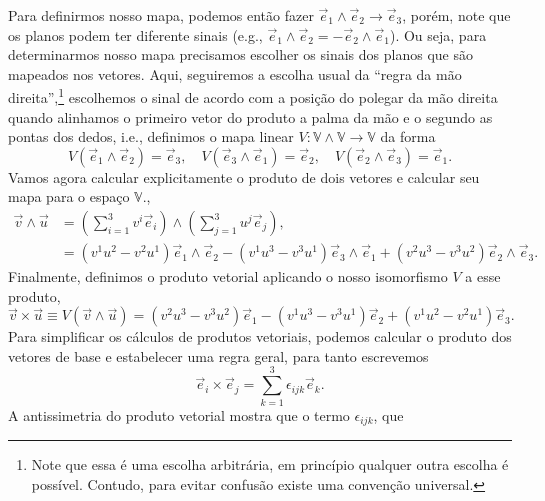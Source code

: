 Para definirmos nosso mapa, podemos então fazer $\vec{e}_1\wedge\vec{e}_2 \to
	\vec{e}_3$, porém, note que os planos podem ter diferente sinais (e.g.,
$\vec{e}_1\wedge\vec{e}_2 = -\vec{e}_2\wedge\vec{e}_1$). Ou seja, para
determinarmos nosso mapa precisamos escolher os sinais dos planos que são
mapeados nos vetores. Aqui, seguiremos a escolha usual da ``regra da mão
direita'',\footnote{Note que essa é uma escolha arbitrária, em princípio
	qualquer outra escolha é possível. Contudo, para evitar confusão existe uma
	convenção universal.} escolhemos o sinal de acordo com a posição do polegar da
mão direita quando alinhamos o primeiro vetor do produto a palma da mão e o
segundo as pontas dos dedos, i.e., definimos o mapa linear
$V:\mathbb{V}\wedge\mathbb{V}\to\mathbb{V}$ da forma
\begin{equation}\label{vecprod}
	V(\vec{e}_1\wedge\vec{e}_2) = \vec{e}_3, \quad V(\vec{e}_3\wedge\vec{e}_1) = \vec{e}_2, \quad V(\vec{e}_2\wedge\vec{e}_3) = \vec{e}_1.
\end{equation}
Vamos agora calcular explicitamente o produto de dois vetores e calcular seu
mapa para o espaço $\mathbb{V}$.,
\begin{equation}\label{wedprod}
	\begin{split}
		\vec{v}\wedge\vec{u} & = \left(\sum_{i=1}^3v^i\vec{e}_i\right)\wedge\left(\sum_{j=1}^3u^j\vec{e}_j\right),                                                                         \\
		                     & = \left(v^1u^2-v^2u^1\right)\vec{e}_1\wedge\vec{e}_2-\left(v^1u^3-v^3u^1\right)\vec{e}_3\wedge\vec{e}_1+\left(v^2u^3-v^3u^2\right)\vec{e}_2\wedge\vec{e}_3.
	\end{split}
\end{equation}
Finalmente, definimos o produto vetorial aplicando o nosso isomorfismo $V$ a
esse produto,
\begin{equation}\label{vprod}
	\vec{v}\times\vec{u} \equiv V(\vec{v}\wedge\vec{u}) =\left(v^2u^3-v^3u^2\right)\vec{e}_1-\left(v^1u^3-v^3u^1\right)\vec{e}_2+ \left(v^1u^2-v^2u^1\right)\vec{e}_3.
\end{equation}
Para simplificar os cálculos de produtos vetoriais, podemos calcular o produto
dos vetores de base e estabelecer uma regra geral, para tanto escrevemos
\begin{equation}\label{levicivita}
	\vec{e}_i\times\vec{e}_j = \sum_{k=1}^3\epsilon_{ijk}\vec{e}_k.
\end{equation}
A antissimetria do produto vetorial mostra que o termo $\epsilon_{ijk}$, que
